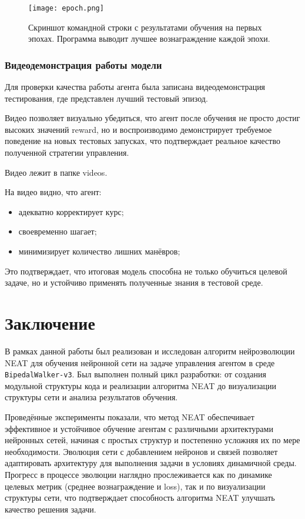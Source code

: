 \documentclass[a4paper,12pt]{article}
\begin{document}
\begin{figure}[H]
	\centering
	\texttt{[image: epoch.png]}
	\caption{Скриншот командной строки с результатами обучения на первых эпохах. Программа выводит лучшее вознаграждение каждой эпохи.}
	\label{fig:training_screenshot}
\end{figure}
\subsubsection{Видеодемонстрация работы модели}

Для  проверки качества работы агента была записана видеодемонстрация тестирования, где представлен лучший тестовый эпизод.

Видео позволяет визуально убедиться, что агент после обучения не просто достиг высоких значений reward, но и воспроизводимо демонстрирует требуемое поведение на новых тестовых запусках, что подтверждает реальное качество полученной стратегии управления.

Видео лежит в  папке videos.

На видео видно, что агент:
\begin{itemize}
	\item адекватно корректирует курс;
	\item своевременно шагает;
	\item минимизирует количество лишних манёвров;
\end{itemize}

Это подтверждает, что итоговая модель способна не только обучиться целевой задаче, но и устойчиво применять полученные знания в тестовой среде.
\newpage
\section{Заключение}


В рамках данной работы был реализован и исследован алгоритм нейроэволюции NEAT для обучения нейронной сети на задаче управления агентом в среде \texttt{BipedalWalker-v3}. Был выполнен полный цикл разработки: от создания модульной структуры кода и реализации алгоритма NEAT до визуализации структуры сети и анализа результатов обучения.

Проведённые эксперименты показали, что метод NEAT обеспечивает эффективное и устойчивое обучение агентам с различными архитектурами нейронных сетей, начиная с простых структур и постепенно усложняя их по мере необходимости. Эволюция сети с добавлением нейронов и связей позволяет адаптировать архитектуру для выполнения задачи в условиях динамичной среды. Прогресс в процессе эволюции наглядно прослеживается как по динамике целевых метрик (среднее вознаграждение и loss), так и по визуализации структуры сети, что подтверждает способность алгоритма NEAT улучшать качество решения задачи.
\end{document}

